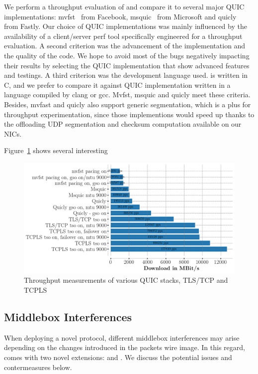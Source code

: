 We perform a throughput evaluation of \tcpls and compare it to several major
QUIC implementations: mvfst~\cite{} from Facebook, msquic~\cite{} from Microsoft
and quicly~\cite{} from Fastly. Our choice of QUIC implementations was mainly
influenced by the availability of a client/server perf tool specifically
engineered for a throughput evaluation. A second criterion was the advancement
of the implementation and the quality of the code. We hope to avoid most of the
bugs negatively impacting their results by selecting the QUIC implementation
that show advanced features and testings. A third criterion was the development
language used. \tcpls is written in C, and we prefer to compare it against QUIC
implementation written in a language compiled by clang or gcc. Mvfst, msquic
and quicly meet these criteria. Besides, mvfast and quicly also support generic
segmentation, which is a plus for throughput experimentation, since those
implementions would speed up thanks to the offloading UDP segmentation and
checksum computation available on our NICs.

Figure~\ref{fig:perf} shows several interesting

\begin{figure}[!t]
   \begin{center}
     \includegraphics[width=\columnwidth]{figures/perf_analysis.png}
   \end{center}
   \caption{Throughput measurements of various QUIC stacks, TLS/TCP and TCPLS}
   \label{fig:perf}
\end{figure}

\subsection{Middlebox Interferences}

When deploying a novel protocol, different middlebox interferences may arise
depending on the changes introduced in the packets wire image. In this
regard, \tcpls comes with two novel \tls extensions: \tcpls and \join.
We discuss the potential issues and contermeasures below.

